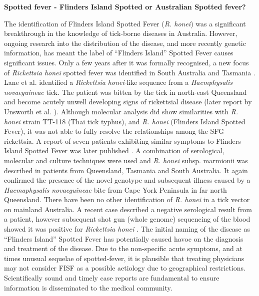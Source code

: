 \documentclass[a4paper, nobind]{templates/ociamthesis}
\begin{document}
\textbf{Spotted fever - Flinders Island Spotted or Australian Spotted fever?}

The identification of Flinders Island Spotted Fever (\emph{R. honei}) was a significant breakthrough in the knowledge of tick-borne diseases in Australia.
However, ongoing research into the distribution of the disease, and more recently genetic information, has meant the label of ``Flinders Island'' Spotted Fever causes significant issues.
Only a few years after it was formally recognised, a new focus of \emph{Rickettsia honei} spotted fever was identified in South Australia and Tasmania \autocite{dyerNewFocusRickettsia2005,unsworthNotOnlyFlinders2005}.
Lane et al. \autocite*{laneEvidenceSpottedFeverlike2005a} identified a \emph{Rickettsia honei}-like sequence from a \emph{Haemphysalis novaeguineae} tick.
The patient was bitten by the tick in north-east Queensland and become acutely unwell developing signs of rickettsial disease (later report by Unsworth et al. \autocite*{unsworthThreeRickettsiosesDarnley2007}).
Although molecular analysis did show similarities with \emph{R. honei} strain TT-118 (Thai tick typhus), and \emph{R. honei} (Flinders Island Spotted Fever), it was not able to fully resolve the relationships among the SFG rickettsia.
A report of seven patients exhibiting similar symptoms to Flinders Island Spotted Fever was later published \autocite{unsworthThreeRickettsiosesDarnley2007}.
A combination of serological, molecular and culture techniques were used and \emph{R. honei} subsp. marmionii was described in patients from Queensland, Tasmania and South Australia.
It again confirmed the presence of the novel genotype and subsequent illness caused by a \emph{Haemaphysalis novaeguineae} bite from Cape York Peninsula in far north Queensland.
There have been no other identification of \emph{R. honei} in a tick vector on mainland Australia.
A recent case described a negative serological result from a patient, however subsequent shot gun (whole genome) sequencing of the blood showed it was positive for \emph{Rickettsia honei} \autocite{grahamDetectionSpottedFever2017}.
The initial naming of the disease as ``Flinders Island'' Spotted Fever has potentially caused havoc on the diagnosis and treatment of the disease.
Due to the non-specific acute symptoms, and at times unusual sequelae of spotted-fever, it is plausible that treating physicians may not consider FISF as a possible aetiology due to geographical restrictions.
Scientifically sound and timely case reports are fundamental to ensure information is disseminated to the medical community.
\end{document}
